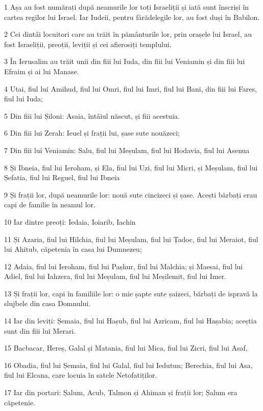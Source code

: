 \par 1 Așa au fost numărați după neamurile lor toți Israeliții și iată sunt înscriși în cartea regilor lui Israel. Iar Iudeii, pentru fărădelegile lor, au fost duși în Babilon.
\par 2 Cei dintâi locuitori care au trăit în pământurile lor, prin orașele lui Israel, au fost Israeliții, preoții, leviții și cei afierosiți templului.
\par 3 În Ierusalim au trăit unii din fiii lui Iuda, din fiii lui Veniamin și din fiii lui Efraim și ai lui Manase.
\par 4 Utai, fiul lui Amihud, fiul lui Omri, fiul lui Imri, fiul lui Bani, din fiii lui Fares, fiul lui Iuda;
\par 5 Din fiii lui Șiloni: Asaia, întâiul născut, și fiii acestuia.
\par 6 Din fiii lui Zerah: Ieuel și frații lui, șase sute nouăzeci;
\par 7 Din fiii lui Veniamin: Salu, fiul lui Meșulam, fiul lui Hodavia, fiul lui Asenua
\par 8 Și Ibneia, fiul lui Ieroham, și Ela, fiul lui Uzi, fiul lui Micri, și Meșulam, fiul lui Șefatia, fiul lui Reguel, fiul lui Ibneia
\par 9 Și frații lor, după neamurile lor: nouă sute cincizeci și șase. Acești bărbați erau capi de familie în neamul lor.
\par 10 Iar dintre preoți: Iedaia, Ioiarib, Iachin
\par 11 Și Azaria, fiul lui Hilchia, fiul lui Meșulam, fiul lui Țadoc, fiul lui Meraiot, fiul lui Ahitub, căpetenia în casa lui Dumnezeu;
\par 12 Adaia, fiul lui Ieroham, fiul lui Pașhur, fiul lui Malchia; și Maesai, fiul lui Adiel, fiul lui Iahzera, fiul lui Meșulam, fiul lui Meșilemit, fiul lui Imer.
\par 13 Și frații lor, capi în familiile lor: o mie șapte sute șaizeci, bărbați de ispravă la slujbele din casa Domnului.
\par 14 Iar din leviți: Șemaia, fiul lui Hașub, fiul lui Azricam, fiul lui Hașabia; aceștia sunt din fiii lui Merari.
\par 15 Bacbacar, Hereș, Galal și Matania, fiul lui Mica, fiul lui Zicri, fiul lui Asaf,
\par 16 Obadia, fiul lui Șemaia, fiul lui Galal, fiul lui Iedutun; Berechia, fiul lui Asa, fiul lui Elcana, care locuia în satele Netofatiților.
\par 17 Iar din portari: Șalum, Acub, Talmon și Ahiman și frații lor; Șalum era căpetenie.
